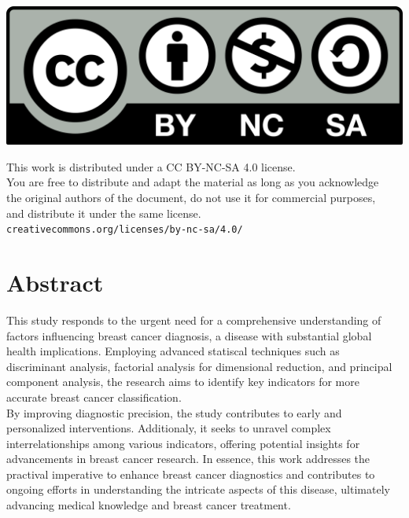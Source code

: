 \documentclass[10pt,a4paper]{article}
\theoremstyle{definition}
\theoremstyle{definition}
\begin{document}
\parbox[t]{\textwidth}{
  \includegraphics[scale=0.05]{by-nc-sa.png}\\[4pt]
  \raggedright %
  \sffamily\large
  {\Large This work is distributed under a CC BY-NC-SA 4.0 license.}\\[4pt]
  You are free to distribute and adapt the material as long as you acknowledge\\
  the original authors of the document, do not use it for commercial purposes,\\
  and distribute it under the same license.\\[4pt]
  \texttt{creativecommons.org/licenses/by-nc-sa/4.0/}
}

\newpage

\tableofcontents

\newpage

\section{Abstract}
This study responds to the urgent need for a comprehensive understanding of factors influencing breast cancer diagnosis, a disease with substantial global health implications. Employing advanced statiscal techniques such as discriminant analysis, factorial analysis for dimensional reduction, and principal component analysis, the research aims to identify key indicators for more accurate breast cancer classification. \\

By improving diagnostic precision, the study contributes to early and personalized interventions. Additionaly, it seeks to unravel complex interrelationships among various indicators, offering potential insights for advancements in breast cancer research. In essence, this work addresses the practival imperative to enhance breast cancer diagnostics and contributes to ongoing efforts in understanding the intricate aspects of this disease, ultimately advancing medical knowledge and breast cancer treatment.
\end{document}
